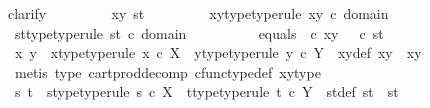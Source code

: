\begin{isabellebody}
{\isacharparenleft}{\kern0pt}clarify{\isacharparenright}{\kern0pt}\isanewline
\ \ \ \ \ \ \ \isamarkupfalse%
\ xy\ st\isanewline
\ \ \ \ \ \ \ \isamarkupfalse%
\ xy{\isacharunderscore}{\kern0pt}type{\isacharbrackleft}{\kern0pt}type{\isacharunderscore}{\kern0pt}rule{\isacharbrackright}{\kern0pt}{\isacharcolon}{\kern0pt}\ {\isachardoublequoteopen}xy\ {\isasymin}\isactrlsub c\ domain\ {\isasymTheta}{\isachardoublequoteclose}\isanewline
\ \ \ \ \ \ \ \isamarkupfalse%
\ st{\isacharunderscore}{\kern0pt}type{\isacharbrackleft}{\kern0pt}type{\isacharunderscore}{\kern0pt}rule{\isacharbrackright}{\kern0pt}{\isacharcolon}{\kern0pt}\ {\isachardoublequoteopen}st\ {\isasymin}\isactrlsub c\ domain\ {\isasymTheta}{\isachardoublequoteclose}\isanewline
\ \ \ \ \ \ \ \isamarkupfalse%
\ equals{\isacharcolon}{\kern0pt}\ {\isachardoublequoteopen}{\isasymTheta}\ {\isasymcirc}\isactrlsub c\ xy\ {\isacharequal}{\kern0pt}\ {\isasymTheta}\ {\isasymcirc}\isactrlsub c\ st{\isachardoublequoteclose}\isanewline
\ \ \ \ \ \ \ \isamarkupfalse%
\ x\ y\ \ x{\isacharunderscore}{\kern0pt}type{\isacharbrackleft}{\kern0pt}type{\isacharunderscore}{\kern0pt}rule{\isacharbrackright}{\kern0pt}{\isacharcolon}{\kern0pt}\ {\isachardoublequoteopen}x\ {\isasymin}\isactrlsub c\ X{\isachardoublequoteclose}\ \ y{\isacharunderscore}{\kern0pt}type{\isacharbrackleft}{\kern0pt}type{\isacharunderscore}{\kern0pt}rule{\isacharbrackright}{\kern0pt}{\isacharcolon}{\kern0pt}\ {\isachardoublequoteopen}y\ {\isasymin}\isactrlsub c\ Y{\isachardoublequoteclose}\ \ xy{\isacharunderscore}{\kern0pt}def{\isacharcolon}{\kern0pt}\ {\isachardoublequoteopen}xy\ {\isacharequal}{\kern0pt}\ {\isasymlangle}x{\isacharcomma}{\kern0pt}y{\isasymrangle}{\isachardoublequoteclose}\isanewline
\ \ \ \ \ \ \ \ \ \isamarkupfalse%
\ {\isacharparenleft}{\kern0pt}metis\ {\isasymTheta}{\isacharunderscore}{\kern0pt}type\ cart{\isacharunderscore}{\kern0pt}prod{\isacharunderscore}{\kern0pt}decomp\ cfunc{\isacharunderscore}{\kern0pt}type{\isacharunderscore}{\kern0pt}def\ xy{\isacharunderscore}{\kern0pt}type{\isacharparenright}{\kern0pt}\isanewline
\ \ \ \ \ \ \ \isamarkupfalse%
\ s\ t\ \ s{\isacharunderscore}{\kern0pt}type{\isacharbrackleft}{\kern0pt}type{\isacharunderscore}{\kern0pt}rule{\isacharbrackright}{\kern0pt}{\isacharcolon}{\kern0pt}\ {\isachardoublequoteopen}s\ {\isasymin}\isactrlsub c\ X{\isachardoublequoteclose}\ \ t{\isacharunderscore}{\kern0pt}type{\isacharbrackleft}{\kern0pt}type{\isacharunderscore}{\kern0pt}rule{\isacharbrackright}{\kern0pt}{\isacharcolon}{\kern0pt}\ {\isachardoublequoteopen}t\ {\isasymin}\isactrlsub c\ Y{\isachardoublequoteclose}\ \ st{\isacharunderscore}{\kern0pt}def{\isacharcolon}{\kern0pt}\ {\isachardoublequoteopen}st\ {\isacharequal}{\kern0pt}\ {\isasymlangle}s{\isacharcomma}{\kern0pt}t{\isasymrangle}{\isachardoublequoteclose}\isanewline

\end{isabellebody}
